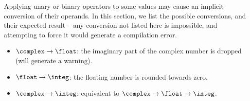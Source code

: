 Applying unary or binary operators to some values may cause an implicit conversion of their operands. In this section, we list the possible conversions, and their expected result -- any conversion not listed here is impossible, and attempting to force it would generate a compilation error.

\begin{itemize}
  \item $\complex\to\float$: the imaginary part of the complex number is dropped (will generate a warning).
  \item $\float\to\integ$: the floating number is rounded towards zero.
  \item $\complex\to\integ$: equivalent to $\complex\to\float\to\integ$.
\end{itemize}
